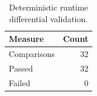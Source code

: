 \begin{table}[t]
\centering
\caption{Deterministic runtime differential validation.}
\label{tab:runtime}
\small
\begin{tabular}{lr}
\toprule
Measure & Count \\
\midrule
Comparisons & 32 \\
Passed & 32 \\
Failed & 0 \\
\bottomrule
\end{tabular}
\end{table}
